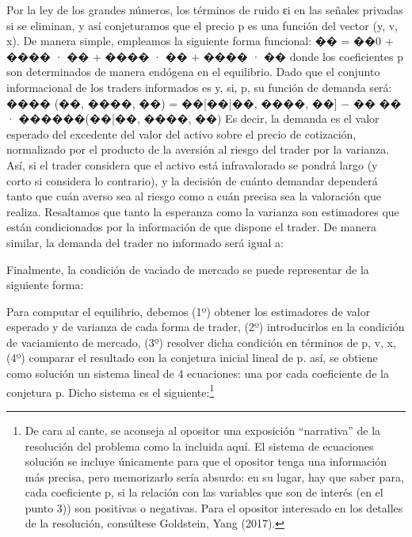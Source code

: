 \documentclass[10pt,a4paper]{article}
\begin{document}
Por la ley de los grandes números, los términos de ruido εi en las señales privadas si se eliminan,
y así conjeturamos que el precio p es una función del vector (y, v, x). De manera simple,
empleamos la siguiente forma funcional:
�� = ��0 + ���� · �� + ���� · �� + ���� · ��
donde los coeficientes p son determinados de manera endógena en el equilibrio.
Dado que el conjunto informacional de los traders informados es {y, si, p}, su función de demanda
será:
���� (��, ����, ��) =
��[��|��, ����, ��] − ��
�� · ������(��|��, ����, ��)
Es decir, la demanda es el valor esperado del excedente del valor del activo sobre el precio de cotización, normalizado por el producto de la aversión al riesgo del trader por la varianza. Así, si el trader considera que el activo está infravalorado se pondrá largo (y corto si considera lo contrario), y la decisión de cuánto demandar dependerá tanto que cuán averso sea al riesgo como a cuán precisa sea la valoración que realiza. Resaltamos que tanto la esperanza como la varianza son estimadores que están condicionados por la información de que dispone el trader. De manera similar, la demanda del trader no informado será igual a:


Finalmente, la condición de vaciado de mercado se puede representar de la siguiente forma:


Para computar el equilibrio, debemos (1º) obtener los estimadores de valor esperado y de varianza de cada forma de trader, (2º) introducirlos en la condición de vaciamiento de mercado, (3º) resolver dicha condición en términos de p, v, x, (4º) comparar el resultado con la conjetura inicial lineal de p. así, se obtiene como solución un sistema lineal de 4 ecuaciones: una por cada coeficiente de la conjetura p. Dicho sistema es el siguiente:\footnote{%
    De cara al cante, se aconseja al opositor una exposición “narrativa” de la resolución del problema como la incluida aquí. El sistema de ecuaciones solución se incluye únicamente para que el opositor tenga una información más precisa, pero memorizarlo sería absurdo: en su lugar, hay que saber para, cada coeficiente p, si la relación con las variables que son de interés (en el punto 3)) son positivas o negativas. Para el opositor interesado en los detalles de la resolución, consúltese Goldstein, Yang (2017).
}
\end{document}

